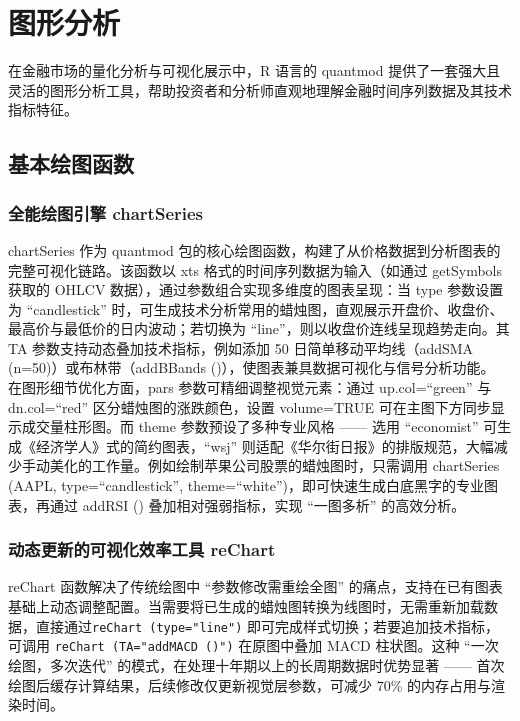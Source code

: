 \documentclass[]{ctexbook}
\begin{document}
\chapter{图形分析}\label{graphs}

在金融市场的量化分析与可视化展示中，R 语言的 quantmod 提供了一套强大且灵活的图形分析工具，帮助投资者和分析师直观地理解金融时间序列数据及其技术指标特征。

\section{基本绘图函数}\label{ux57faux672cux7ed8ux56feux51fdux6570}

\subsection{全能绘图引擎 chartSeries}\label{ux5168ux80fdux7ed8ux56feux5f15ux64ce-chartseries}

chartSeries 作为 quantmod 包的核心绘图函数，构建了从价格数据到分析图表的完整可视化链路。该函数以 xts 格式的时间序列数据为输入（如通过 getSymbols 获取的 OHLCV 数据），通过参数组合实现多维度的图表呈现：当 type 参数设置为 ``candlestick'' 时，可生成技术分析常用的蜡烛图，直观展示开盘价、收盘价、最高价与最低价的日内波动；若切换为 ``line''，则以收盘价连线呈现趋势走向。其 TA 参数支持动态叠加技术指标，例如添加 50 日简单移动平均线（addSMA (n=50)）或布林带（addBBands ()），使图表兼具数据可视化与信号分析功能。
在图形细节优化方面，pars 参数可精细调整视觉元素：通过 up.col=``green'' 与 dn.col=``red'' 区分蜡烛图的涨跌颜色，设置 volume=TRUE 可在主图下方同步显示成交量柱形图。而 theme 参数预设了多种专业风格 ------ 选用 ``economist'' 可生成《经济学人》式的简约图表，``wsj'' 则适配《华尔街日报》的排版规范，大幅减少手动美化的工作量。例如绘制苹果公司股票的蜡烛图时，只需调用 chartSeries (AAPL, type=``candlestick'', theme=``white'')，即可快速生成白底黑字的专业图表，再通过 addRSI () 叠加相对强弱指标，实现 ``一图多析'' 的高效分析。

\subsection{动态更新的可视化效率工具 reChart}\label{ux52a8ux6001ux66f4ux65b0ux7684ux53efux89c6ux5316ux6548ux7387ux5de5ux5177-rechart}

reChart 函数解决了传统绘图中 ``参数修改需重绘全图'' 的痛点，支持在已有图表基础上动态调整配置。当需要将已生成的蜡烛图转换为线图时，无需重新加载数据，直接通过\texttt{reChart\ (type="line")} 即可完成样式切换；若要追加技术指标，可调用 \texttt{reChart\ (TA="addMACD\ ()")} 在原图中叠加 MACD 柱状图。这种 ``一次绘图，多次迭代'' 的模式，在处理十年期以上的长周期数据时优势显著 ------ 首次绘图后缓存计算结果，后续修改仅更新视觉层参数，可减少 70\% 的内存占用与渲染时间。
\end{document}

